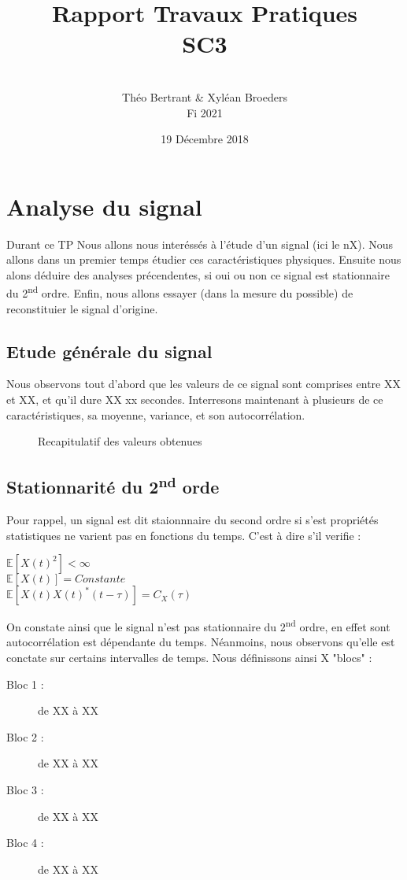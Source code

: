 \documentclass[french, a4paper, 12pt, openany]{book}
\title{\Huge{Rapport Travaux Pratiques \\ SC3}}
\author{\\ Théo Bertrant \& Xyléan Broeders \\ Fi 2021}
\date{19 Décembre 2018}
\begin{document}
\maketitle

\chapter{Analyse du signal}
Durant ce TP Nous allons nous interéssés à l'étude d'un signal (ici le nX). Nous allons dans un premier temps étudier ces caractéristiques physiques. Ensuite nous alons déduire des analyses précendentes, si oui ou non ce signal est stationnaire du 2\textsuperscript{nd} ordre. Enfin, nous allons essayer (dans la mesure du possible) de reconstituier le signal d'origine.
\section{Etude générale du signal}
  Nous observons tout d'abord que les valeurs de ce signal sont comprises entre XX et XX, et qu'il dure XX xx secondes.
  Interresons maintenant à plusieurs de ce caractéristiques, sa moyenne, variance, et son autocorrélation.
  \begin{figure}[ht]
    \begin{center}
    \end{center}
    \caption{Recapitulatif des valeurs obtenues}
    \label{Recapitulatif des valeurs obtenues}
  \end{figure}

\section{Stationnarité du 2\textsuperscript{nd} orde}
  Pour rappel, un signal est dit staionnnaire du second ordre si s'est propriétés statistiques ne varient pas en fonctions du temps. C'est à dire s'il verifie : 
  \begin{center}
  	\begin{math}\mathbb{E}[X(t)^2]<\infty\end{math} \\
  	\begin{math}\mathbb{E}[X(t)]=Constante\end{math} \\
  	\begin{math}\mathbb{E}[X(t)X(t)^*(t-\tau)]=C_X(\tau)\end{math}
  \end{center}
  On constate ainsi que le signal n'est pas stationnaire du 2\textsuperscript{nd} ordre, en effet sont autocorrélation est dépendante du temps. Néanmoins, nous observons qu'elle est conctate sur certains intervalles de temps. Nous définissons ainsi X "blocs" :
  \begin{description}
    \item[Bloc 1 : ]de XX à XX
    \item[Bloc 2 : ]de XX à XX
    \item[Bloc 3 : ]de XX à XX
    \item[Bloc 4 : ]de XX à XX
  \end{description}
\end{document}
